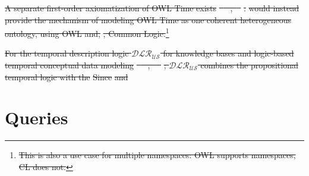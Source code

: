 \documentclass[10pt,fleqn,final]{scrreprt}
\makeatletter
\newcommand*{\eg}{e.g.\@\xspace}
\newcommand*{\DOL}{\ensuremath{\mathsf{DOL}}\xspace}
\newcommand{\sclause}[1]{\section{#1}}
\providecommand{\DIFdel}[1]{{\protect\color{red}\sout{#1}}}                      %
\providecommand{\DIFaddbegin}{} %
\providecommand{\DIFdelend}{} %
\makeatother
\begin{document}
\DIFdel{A separate first-order axiomatization of OWL Time exists
}%
\DIFdel{\mbox{%
\cite{OWLTime}
}%
,\mbox{%
\cite{OWLSTime}
}%
}%
\DIFdel{.  }%
\DIFdel{would instead provide the mechanism of modeling
OWL Time as one coherent heterogeneous ontology, using OWL and, }%
\DIFdel{, Common Logic.}\footnote{\DIFdel{This is also a use case for multiple namespaces:
  OWL supports namespaces, CL does not.}}  %
\addtocounter{footnote}{-1}%
\DIFdel{For the temporal description
logic $\mathcal{DLR_{US}}$ for knowledge bases and logic-based
temporal conceptual data modeling }%
\DIFdel{\mbox{%
\cite{Artale02}
}%
, \mbox{%
\cite{Artale07a}
}%
}%
\DIFdel{;
$\mathcal{DLR_{US}}$ combines the propositional temporal logic with
the }%
\DIFdel{Since}%
\DIFdel{and }\DIFdelend \DIFaddbegin \sclause{Queries}\label{ex:queries}
\end{document}

